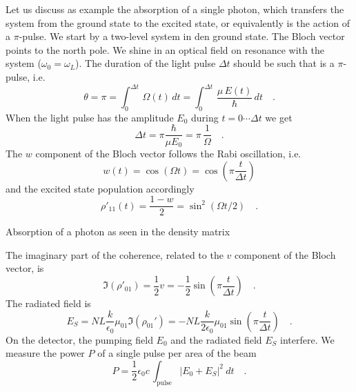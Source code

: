 Let us discuss as example the absorption of a single photon, which transfers the system from the ground state to the excited state, or equivalently is the action of a $\pi$-pulse. We start by a two-level system in den ground state. The Bloch vector points to the north pole. We shine in an optical field on resonance with the system ($\omega_0 = \omega_L$). The duration of the light pulse $\Delta t$ should be such that is a $\pi$-pulse, i.e.
\begin{equation}
 \theta = \pi = \int_0^{\Delta t} \, \Omega(t) \, dt =  \int_0^{\Delta t} \, \frac{ \mu \, E(t)}{\hbar} \, dt \quad .
\end{equation}
When the light pulse has the amplitude $E_0$ during $t= 0 \cdots \Delta t$ we get
\begin{equation}
 \Delta t = \pi \frac{\hbar}{\mu E_0}  = \pi \, \frac{1}{\Omega} \quad .
\end{equation} 
The $w$ component of the Bloch vector follows the Rabi oscillation, i.e.
\begin{equation}
 w(t) = \cos ( \Omega t  ) = \cos \left( \pi  \frac{t}{\Delta t} \right) 
\end{equation}
and the excited state population accordingly
\begin{equation}
 \rho'_{11}(t) = \frac{1 - w}{2}  = \sin^2 ( \Omega t /2 ) \quad .
\end{equation}
%
\begin{marginfigure}[-49mm]
\caption{Absorption of a photon as seen in the density matrix}
\label{fig:fid_rho_single_photon}
\end{marginfigure}
%
The imaginary part of the coherence, related to the $v$ component of the Bloch vector, is
\begin{equation}
 \Im (\rho'_{01} ) = \frac{1}{2} v =  - \frac{1}{2}  \sin \left( \pi \frac{t}{\Delta t} \right) \quad .
\end{equation}
The radiated field is 
\begin{equation}
 E_S  = N L \frac{k }{\epsilon_0}  \mu_{01} \Im (\rho_{01}' ) 
 = - N L \frac{k }{2 \epsilon_0}  \mu_{01} \sin \left( \pi \frac{t}{\Delta t} \right) \quad .
\end{equation}
On the detector, the pumping field $E_0$ and the radiated field $E_S$ interfere. We measure the power $P$ of a single pulse per area of the beam  
\begin{equation}
P  = \frac{1}{2} \epsilon_0 c \, \int_\text{pulse} | E_0 + E_S |^2 \ dt \quad .\label{eq:fid_P}
\end{equation}
